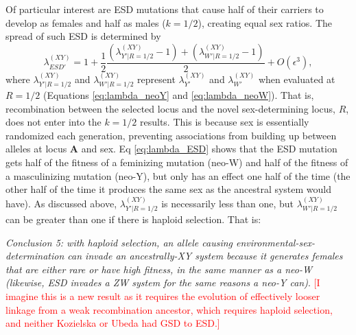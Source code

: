 \documentclass[10pt,letterpaper]{article}
\begin{document}
Of particular interest are ESD mutations that cause half of their carriers to develop as females and half as males ($k=1/2$), creating equal sex ratios.
The spread of such ESD is determined by
\begin{equation}
\lambda_{ESD'}^{(XY)} =1+ \frac{1}{2}\frac{(\lambda_{Y'\rvert R=1/2}^{(XY)}-1) + (\lambda_{W'\rvert R=1/2}^{(XY)}-1)}{2} + O\left(\epsilon^3\right),
\label{eq:lambda_ESD}
\end{equation}
\noindent
where $\lambda_{Y'\rvert R=1/2}^{(XY)}$ and $\lambda_{W'\rvert R=1/2}^{(XY)}$ represent $\lambda_{Y'}^{(XY)}$ and $\lambda_{W'}^{(XY)}$ when evaluated at $R=1/2$ (Equations \ref{eq:lambda_neoY} and \ref{eq:lambda_neoW}).
That is, recombination between the selected locus and the novel sex-determining locus, $R$, does not enter into the $k=1/2$ results.
This is because sex is essentially randomized each generation, %
preventing associations from building up between alleles at locus $\mathbf{A}$ and sex. 
Eq \eqref{eq:lambda_ESD} shows that the ESD mutation gets half of the fitness of a feminizing mutation (neo-W) and half of the fitness of a masculinizing mutation (neo-Y), but only has an effect one half of the time (the other half of the time it produces the same sex as the ancestral system would have). 
As discussed above, $\lambda_{Y'\rvert R=1/2}^{(XY)}$ is necessarily less than one, but $\lambda_{W'\rvert R=1/2}^{(XY)}$ can be greater than one if there is haploid selection.
That is:
\vspace{0.5cm}

\noindent\textit{Conclusion 5: with haploid selection, an allele causing environmental-sex-determination can invade an ancestrally-XY system because it generates females that are either rare or have high fitness, in the same manner as a neo-W (likewise, ESD invades a ZW system for the same reasons a neo-Y can)}.
\textcolor{red}{[I imagine this is a new result as it requires the evolution of effectively looser linkage from a weak recombination ancestor, which requires haploid selection, and neither Kozielska or Ubeda had GSD to ESD.]}
\vspace{0.5cm} 
\end{document}
